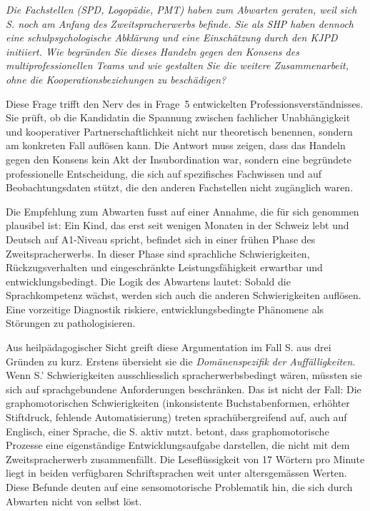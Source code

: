 \documentclass[ngerman, a4paper]{article}
\begin{document}
\begin{tcolorbox}[colback=gray!5, colframe=gray!50, title=Weiterführende Diskurslinie]
\itshape
Die Fachstellen (SPD, Logopädie, PMT) haben zum Abwarten geraten, weil sich S.
noch am Anfang des Zweitspracherwerbs befinde. Sie als SHP haben dennoch eine
schulpsychologische Abklärung und eine Einschätzung durch den KJPD initiiert.
Wie begründen Sie dieses Handeln gegen den Konsens des multiprofessionellen
Teams und wie gestalten Sie die weitere Zusammenarbeit, ohne die
Kooperationsbeziehungen zu beschädigen?
\end{tcolorbox}

Diese Frage trifft den Nerv des in Frage~5 entwickelten Professionsverständnisses.
Sie prüft, ob die Kandidatin die Spannung zwischen fachlicher Unabhängigkeit und
kooperativer Partnerschaftlichkeit nicht nur theoretisch benennen, sondern am
konkreten Fall auflösen kann. Die Antwort muss zeigen, dass das Handeln gegen
den Konsens kein Akt der Insubordination war, sondern eine begründete
professionelle Entscheidung, die sich auf spezifisches Fachwissen und auf
Beobachtungsdaten stützt, die den anderen Fachstellen nicht zugänglich waren.

Die Empfehlung zum Abwarten fusst auf einer Annahme, die für sich genommen
plausibel ist: Ein Kind, das erst seit wenigen Monaten in der Schweiz lebt und
Deutsch auf A1-Niveau spricht, befindet sich in einer frühen Phase des
Zweitspracherwerbs. In dieser Phase sind sprachliche Schwierigkeiten,
Rückzugsverhalten und eingeschränkte Leistungsfähigkeit erwartbar und
entwicklungsbedingt. Die Logik des Abwartens lautet: Sobald die Sprachkompetenz
wächst, werden sich auch die anderen Schwierigkeiten auflösen. Eine vorzeitige
Diagnostik riskiere, entwicklungsbedingte Phänomene als Störungen zu
pathologisieren.

Aus heilpädagogischer Sicht greift diese Argumentation im Fall S. aus drei
Gründen zu kurz. Erstens übersieht sie die \textit{Domänenspezifik der
Auffälligkeiten}. Wenn S.' Schwierigkeiten ausschliesslich spracherwerbsbedingt
wären, müssten sie sich auf sprachgebundene Anforderungen beschränken. Das
ist nicht der Fall: Die graphomotorischen Schwierigkeiten (inkonsistente
Buchstabenformen, erhöhter Stiftdruck, fehlende Automatisierung) treten
sprachübergreifend auf, auch auf Englisch, einer Sprache, die S. aktiv nutzt.
\textcite[S.\,2--4]{sturm2016graphomotorik} betont, dass graphomotorische Prozesse eine eigenständige
Entwicklungsaufgabe darstellen, die nicht mit dem Zweitspracherwerb
zusammenfällt. Die Leseflüssigkeit von 17
Wörtern pro Minute liegt in beiden verfügbaren Schriftsprachen weit unter
altersgemässen Werten. Diese Befunde deuten auf eine sensomotorische
Problematik hin, die sich durch Abwarten nicht von selbst löst.
\end{document}
